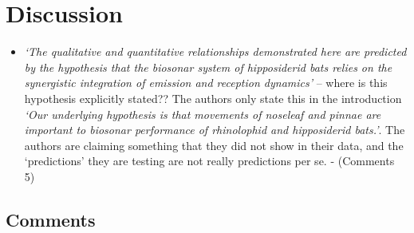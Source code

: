 \documentclass[
]{book}
\providecommand{\tightlist}{%
  \setlength{\itemsep}{0pt}\setlength{\parskip}{0pt}}
\begin{document}
\hypertarget{discussion}{%
\section{Discussion}\label{discussion}}

\begin{itemize}
\tightlist
\item
  \emph{`The qualitative and quantitative relationships demonstrated here are predicted by the hypothesis that the biosonar system of hipposiderid bats relies on the synergistic integration of emission and reception dynamics'} -- where is this hypothesis explicitly stated?? The authors only state this in the introduction \emph{`Our underlying hypothesis is that movements of noseleaf and pinnae are important to biosonar performance of rhinolophid and hipposiderid bats.'}. The authors are claiming something that they did not show in their data, and the `predictions' they are testing are not really predictions per se. - (\protect\hypertarget{com_zhang}{}{Comments 5})
\end{itemize}

\hypertarget{com_zhang}{%
\subsection{Comments}\label{com_zhang}}
\end{document}
